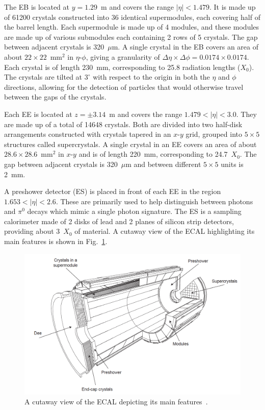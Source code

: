 The EB is located at $y = 1.29$~m and covers the range $|\eta| < 1.479$. It is made up of 61200 crystals constructed into 36 identical supermodules, each covering half of the barrel length. Each supermodule is made up of 4 modules, and these modules are made up of various submodules each containing 2 rows of 5 crystals. The gap between adjacent crystals is 320~$\mu$m. A single crystal in the EB covers an area of about $22{\times}22$~m$\text{m}^2$ in $\eta$-$\phi$, giving a granularity of $\Delta\eta{\times}\Delta\phi = 0.0174{\times}0.0174$. Each crystal is of length 230~mm, corresponding to 25.8 radiation lengths ($X_0$). The crystals are tilted at $3^{\circ}$ with respect to the origin in both the $\eta$ and $\phi$ directions, allowing for the detection of particles that would otherwise travel between the gaps of the crystals.


Each EE is located at $z = \pm 3.14$~m and covers the range $1.479 < |\eta| < 3.0$. They are made up of a total of 14648 crystals. Both are divided into two half-disk arrangements constructed with crystals tapered in an $x$-$y$ grid, grouped into $5{\times}5$ structures called supercrystals. A single crystal in an EE covers an area of about $28.6{\times}28.6$~m$\text{m}^2$ in $x$-$y$ and is of length 220~mm, corresponding to 24.7~$X_0$. The gap between adjacent crystals is 320~$\mu$m and between different $5{\times}5$ units is 2~mm.

A preshower detector (ES) is placed in front of each EE in the region $1.653 < |\eta| < 2.6$. These are primarily used to help distinguish between photons and $\pi^0$ decays which mimic a single photon signature. The ES is a sampling calorimeter made of 2 disks of lead and 2 planes of silicon strip detectors, providing about 3~$X_0$ of material. A cutaway view of the ECAL highlighting its main features is shown in Fig.~\ref{ecal}.

\begin{figure}[!htb]
	\centering
	\includegraphics[scale=0.55]{figures/ecal}
	\caption{A cutaway view of the ECAL depicting its main features~\cite{Chatrchyan:2008aa}.}
	\label{ecal}
\end{figure}


